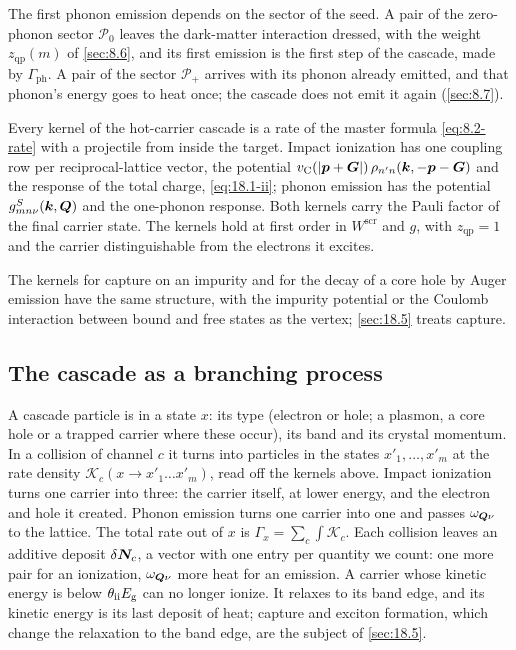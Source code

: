 The first phonon emission depends on the sector of the seed. A pair of the zero-phonon sector $\mathcal{P}_0$ leaves the dark-matter interaction dressed, with the weight $z_{\mathrm{qp}}(m)$ of \cref{sec:8.6}, and its first emission is the first step of the cascade, made by $\varGamma_{\mathrm{ph}}$. A pair of the sector $\mathcal{P}_+$ arrives with its phonon already emitted, and that phonon's energy goes to heat once; the cascade does not emit it again (\cref{sec:8.7}).
\begin{keyresult}
Every kernel of the hot-carrier cascade is a rate of the master formula \cref{eq:8.2-rate} with a projectile from inside the target. Impact ionization has one coupling row per reciprocal-lattice vector, the potential $v_{\mathrm{C}}(|\bm{p}+\bm{G}|)\,\rho_{n'n}(\bm{k},-\bm{p}-\bm{G})$ and the response of the total charge, \cref{eq:18.1-ii}; phonon emission has the potential $g^S_{mn\nu}(\bm{k},\bm{Q})$ and the one-phonon response. Both kernels carry the Pauli factor of the final carrier state. The kernels hold at first order in $W^{\mathrm{scr}}$ and $g$, with $z_{\mathrm{qp}} = 1$ and the carrier distinguishable from the electrons it excites.
\end{keyresult}
\noindent The kernels for capture on an impurity and for the decay of a core hole by Auger emission have the same structure, with the impurity potential or the Coulomb interaction between bound and free states as the vertex; \cref{sec:18.5} treats capture.

\subsection{The cascade as a branching process}\label{sec:18.1-branching}

A cascade particle is in a state $x$: its type (electron or hole; a plasmon, a core hole or a trapped carrier where these occur), its band and its crystal momentum. In a collision of channel $c$ it turns into particles in the states $x'_1, \dots, x'_m$ at the rate density $\mathscr{K}_c(x \to x'_1\dots x'_m)$, read off the kernels above. Impact ionization turns one carrier into three: the carrier itself, at lower energy, and the electron and hole it created. Phonon emission turns one carrier into one and passes $\omega_{\bm{Q}\nu}$ to the lattice. The total rate out of $x$ is $\varGamma_x = \sum_c\int\mathscr{K}_c$. Each collision leaves an additive deposit $\delta\bm{N}_c$, a vector with one entry per quantity we count: one more pair for an ionization, $\omega_{\bm{Q}\nu}$ more heat for an emission. A carrier whose kinetic energy is below $\theta_{\mathrm{ii}}E_{\mathrm{g}}$ can no longer ionize. It relaxes to its band edge, and its kinetic energy is its last deposit of heat; capture and exciton formation, which change the relaxation to the band edge, are the subject of \cref{sec:18.5}.

